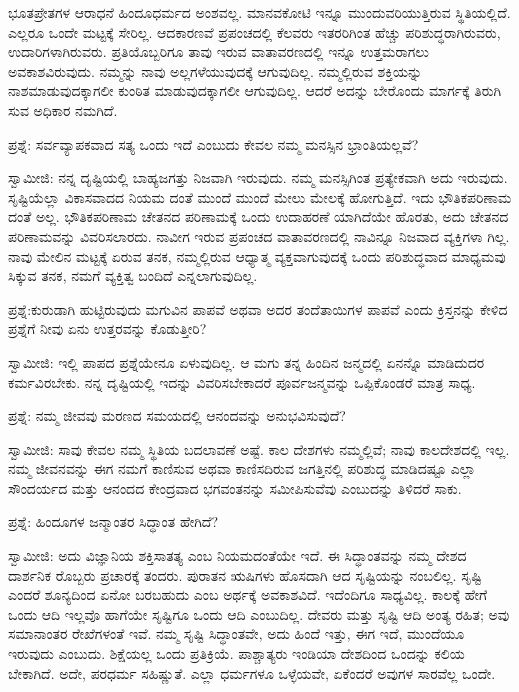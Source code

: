 ಭೂತಪ್ರೇತಗಳ ಆರಾಧನೆ ಹಿಂದೂಧರ್ಮದ ಅಂಶವಲ್ಲ. ಮಾನವಕೋಟಿ ಇನ್ನೂ ಮುಂದುವರಿಯುತ್ತಿರುವ ಸ್ಥಿತಿಯಲ್ಲಿದೆ. ಎಲ್ಲರೂ ಒಂದೇ ಮಟ್ಟಕ್ಕೆ ಸೇರಿಲ್ಲ. ಆದಕಾರಣವೆ ಪ್ರಪಂಚದಲ್ಲಿ ಕೆಲವರು ಇತರರಿಗಿಂತ ಹೆಚ್ಚು ಪರಿಶುದ್ಧರಾಗಿರುವರು, ಉದಾರಿಗಳಾಗಿರುವರು. ಪ್ರತಿಯೊಬ್ಬರಿಗೂ ತಾವು ಇರುವ ವಾತಾವರಣದಲ್ಲಿ ಇನ್ನೂ ಉತ್ತಮರಾಗಲು ಅವಕಾಶವಿರುವುದು. ನಮ್ಮನ್ನು ನಾವು ಅಲ್ಲಗಳೆಯುವುದಕ್ಕೆ ಆಗುವುದಿಲ್ಲ. ನಮ್ಮಲ್ಲಿರುವ ಶಕ್ತಿಯನ್ನು ನಾಶಮಾಡುವುದಕ್ಕಾಗಲೀ ಕುಂಠಿತ ಮಾಡುವುದಕ್ಕಾಗಲೀ ಆಗುವುದಿಲ್ಲ. ಆದರೆ ಅದನ್ನು ಬೇರೊಂದು ಮಾರ್ಗಕ್ಕೆ ತಿರುಗಿ ಸುವ ಅಧಿಕಾರ ನಮಗಿದೆ.

ಪ್ರಶ್ನೆ: ಸರ್ವವ್ಯಾಪಕವಾದ ಸತ್ಯ ಒಂದು ಇದೆ ಎಂಬುದು ಕೇವಲ ನಮ್ಮ ಮನಸ್ಸಿನ ಭ್ರಾಂತಿಯಲ್ಲವೆ?

ಸ್ವಾಮೀಜಿ: ನನ್ನ ದೃಷ್ಟಿಯಲ್ಲಿ ಬಾಹ್ಯಜಗತ್ತು ನಿಜವಾಗಿ ಇರುವುದು. ನಮ್ಮ ಮನಸ್ಸಿಗಿಂತ ಪ್ರತ್ಯೇಕವಾಗಿ ಅದು ಇರುವುದು. ಸೃಷ್ಟಿಯೆಲ್ಲಾ ವಿಕಾಸವಾದದ ನಿಯಮ ದಂತೆ ಮುಂದೆ ಮುಂದೆ ಮೇಲು ಮೇಲಕ್ಕೆ ಹೋಗುತ್ತಿದೆ. ಇದು ಭೌತಿಕಪರಿಣಾಮ ದಂತೆ ಅಲ್ಲ. ಭೌತಿಕಪರಿಣಾಮ ಚೇತನದ ಪರಿಣಾಮಕ್ಕೆ ಒಂದು ಉದಾಹರಣೆ ಯಾಗಿದೆಯೇ ಹೊರತು, ಅದು ಚೇತನದ ಪರಿಣಾಮವನ್ನು ವಿವರಿಸಲಾರದು. ನಾವೀಗ ಇರುವ ಪ್ರಪಂಚದ ವಾತಾವರಣದಲ್ಲಿ ನಾವಿನ್ನೂ ನಿಜವಾದ ವ್ಯಕ್ತಿಗಳಾ ಗಿಲ್ಲ. ನಾವು ಮೇಲಿನ ಮಟ್ಟಕ್ಕೆ ಏರುವ ತನಕ, ನಮ್ಮಲ್ಲಿರುವ ಆಧ್ಯಾತ್ಮ ವ್ಯಕ್ತವಾಗುವುದಕ್ಕೆ ಒಂದು ಪರಿಶುದ್ಧವಾದ ಮಾಧ್ಯಮವು ಸಿಕ್ಕುವ ತನಕ, ನಮಗೆ ವ್ಯಕ್ತಿತ್ವ ಬಂದಿದೆ ಎನ್ನಲಾಗುವುದಿಲ್ಲ.

ಪ್ರಶ್ನೆ:ಕುರುಡಾಗಿ ಹುಟ್ಟಿರುವುದು ಮಗುವಿನ ಪಾಪವೆ ಅಥವಾ ಅದರ ತಂದೆತಾಯಿಗಳ ಪಾಪವೆ ಎಂದು ಕ್ರಿಸ್ತನನ್ನು ಕೇಳಿದ ಪ್ರಶ್ನೆಗೆ ನೀವು ಏನು ಉತ್ತರವನ್ನು ಕೊಡುತ್ತೀರಿ?

ಸ್ವಾಮೀಜಿ: ಇಲ್ಲಿ ಪಾಪದ ಪ್ರಶ್ನೆಯೇನೂ ಏಳುವುದಿಲ್ಲ. ಆ ಮಗು ತನ್ನ ಹಿಂದಿನ ಜನ್ಮದಲ್ಲಿ ಏನನ್ನೊ ಮಾಡಿದುದರ ಕರ್ಮವಿರಬೇಕು. ನನ್ನ ದೃಷ್ಟಿಯಲ್ಲಿ ಇದನ್ನು ವಿವರಿಸಬೇಕಾದರೆ ಪೂರ್ವಜನ್ಮವನ್ನು ಒಪ್ಪಿಕೊಂಡರೆ ಮಾತ್ರ ಸಾಧ್ಯ.

ಪ್ರಶ್ನೆ: ನಮ್ಮ ಜೀವವು ಮರಣದ ಸಮಯದಲ್ಲಿ ಆನಂದವನ್ನು ಅನುಭವಿಸುವುದೆ?

ಸ್ವಾಮೀಜಿ: ಸಾವು ಕೇವಲ ನಮ್ಮ ಸ್ಥಿತಿಯ ಬದಲಾವಣೆ ಅಷ್ಟೆ. ಕಾಲ ದೇಶಗಳು ನಮ್ಮಲ್ಲಿವೆ; ನಾವು ಕಾಲದೇಶದಲ್ಲಿ ಇಲ್ಲ. ನಮ್ಮ ಜೀವನವನ್ನು ಈಗ ನಮಗೆ ಕಾಣಿಸುವ ಅಥವಾ ಕಾಣಿಸದಿರುವ ಜಗತ್ತಿನಲ್ಲಿ ಪರಿಶುದ್ಧ ಮಾಡಿದಷ್ಟೂ ಎಲ್ಲಾ ಸೌಂದರ್ಯದ ಮತ್ತು ಆನಂದದ ಕೇಂದ್ರವಾದ ಭಗವಂತನನ್ನು ಸಮೀಪಿಸುವೆವು ಎಂಬುದನ್ನು ತಿಳಿದರೆ ಸಾಕು.

ಪ್ರಶ್ನೆ: ಹಿಂದೂಗಳ ಜನ್ಮಾಂತರ ಸಿದ್ಧಾಂತ ಹೇಗಿದೆ?

ಸ್ವಾಮೀಜಿ: ಅದು ವಿಜ್ಞಾನಿಯ ಶಕ್ತಿಸಾತತ್ಯ  ಎಂಬ ನಿಯಮದಂತೆಯೇ ಇದೆ. ಈ ಸಿದ್ಧಾಂತವನ್ನು ನಮ್ಮ ದೇಶದ ದಾರ್ಶನಿಕ ರೊಬ್ಬರು ಪ್ರಚಾರಕ್ಕೆ ತಂದರು. ಪುರಾತನ ಋಷಿಗಳು ಹೊಸದಾಗಿ ಆದ ಸೃಷ್ಟಿಯನ್ನು ನಂಬಲಿಲ್ಲ. ಸೃಷ್ಟಿ ಎಂದರೆ ಶೂನ್ಯದಿಂದ ಏನೋ ಬರಬಹುದು ಎಂಬ ಅರ್ಥಕ್ಕೆ ಅವಕಾಶವಿದೆ. ಇದೆಂದಿಗೂ ಸಾಧ್ಯವಿಲ್ಲ. ಕಾಲಕ್ಕೆ ಹೇಗೆ ಒಂದು ಆದಿ ಇಲ್ಲವೊ ಹಾಗೆಯೇ ಸೃಷ್ಟಿಗೂ ಒಂದು ಆದಿ ಎಂಬುದಿಲ್ಲ. ದೇವರು ಮತ್ತು ಸೃಷ್ಟಿ ಆದಿ ಅಂತ್ಯ ರಹಿತ; ಅವು ಸಮಾನಾಂತರ ರೇಖೆಗಳಂತೆ ಇವೆ. ನಮ್ಮ ಸೃಷ್ಟಿ ಸಿದ್ಧಾಂತವೇ, ಅದು ಹಿಂದೆ ಇತ್ತು, ಈಗ ಇದೆ, ಮುಂದೆಯೂ ಇರುವುದು ಎಂಬುದು. ಶಿಕ್ಷೆಯಲ್ಲ ಒಂದು ಪ್ರತಿಕ್ರಿಯೆ. ಪಾಶ್ಚಾತ್ಯರು ಇಂಡಿಯಾ ದೇಶದಿಂದ ಒಂದನ್ನು ಕಲಿಯ ಬೇಕಾಗಿದೆ. ಅದೇ, ಪರಧರ್ಮ ಸಹಿಷ್ಣುತೆ. ಎಲ್ಲಾ ಧರ್ಮಗಳೂ ಒಳ್ಳೆಯವೇ, ಏಕೆಂದರೆ ಅವುಗಳ ಸಾರವೆಲ್ಲ ಒಂದೇ.

